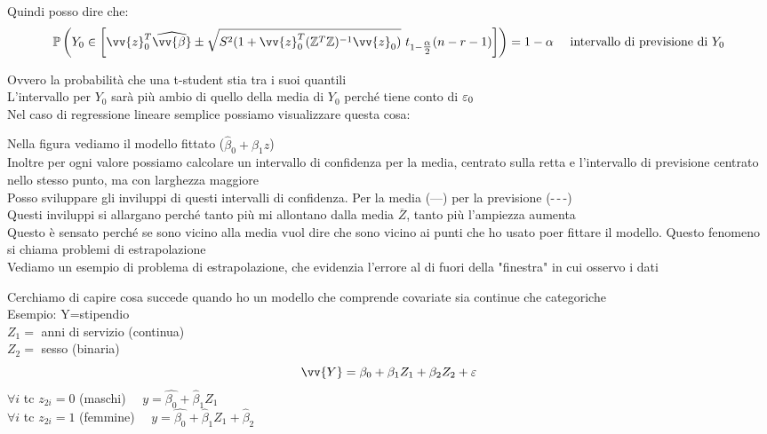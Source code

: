 Quindi posso dire che:
\[
\prob{ Y_0 \in \OO \vv{z}_0^T \hat{\vv{\beta}} \pm \sqrt{S^2(1+\vv{z}_0^T(\ZZ^T\ZZ)^{-1}\vv{z}_0)} \  t_{1-\tfrac{\alpha}{2}} (n-r-1) \CC } = 1-\alpha \ \ \ \text{ intervallo di previsione di } Y_0
\]

Ovvero la probabilità che una t-student stia tra i suoi quantili\\

L'intervallo per $Y_0$ sarà più ambio di quello della media di $Y_0$ perché tiene conto di $\varepsilon_0$\\


Nel caso di regressione lineare semplice possiamo visualizzare questa cosa:


Nella figura vediamo il modello fittato ($\hat{\beta}_0+\hat{\beta}_1z$)\\
Inoltre per ogni valore possiamo calcolare un intervallo di confidenza per la media, centrato sulla retta e l'intervallo di previsione centrato nello stesso punto, ma con larghezza maggiore\\
Posso sviluppare gli inviluppi di questi intervalli di confidenza. Per la media (---) per la previsione (-\,-\,-)\\
Questi inviluppi si allargano perché tanto più mi allontano dalla media $\overline{Z}$, tanto più l'ampiezza aumenta\\

Questo è sensato perché se sono vicino alla media vuol dire che sono vicino ai punti che ho usato poer fittare il modello.
Questo fenomeno si  chiama problemi di estrapolazione\\


Vediamo un esempio di problema di estrapolazione, che evidenzia l'errore al di fuori della "finestra" in cui osservo i dati

\newpage

Cerchiamo di capire cosa succede quando ho un modello che comprende covariate sia continue che categoriche\\

Esempio:
Y=stipendio\\
$Z_1=$ anni di servizio (continua)\\
$Z_2=$ sesso (binaria)
\[
\vv{Y}=\beta_0+\beta_1Z_1+\beta_2Z_2 +\eps
\]
$\forall i$ tc $z_{2i}=0$ (maschi) \ \ $y=\hat{\beta_0}+\hat{\beta}_1Z_1$\\
$\forall i$ tc $z_{2i}=1$ (femmine) \ \ $y=\hat{\beta_0}+\hat{\beta}_1Z_1+\hat{\beta}_2$\\

